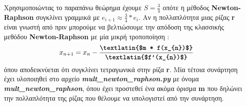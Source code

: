 \documentclass[First Project.tex]{subfiles}
\begin{document}
\begin{itemize}
            Χρησιμοποιώντας το παραπάνω θεώρημα έχουμε \(S = \frac {3}{4}\) οπότε η μέθοδος \textlatin{\textbf{Newton-Raphson}} συγκλίνει γραμμικά
            με \(e_{i+1} \approx \frac{3}{4} * e_{i}\). 
            Αν η πολλαπλότητα μιας ρίζας \textlatin{\textbf{r}} είναι γνωστή από πριν μπορούμε να βελτιώσουμε την απόδοση της κλασσικής μεθόδου \textlatin{\textbf{Newton-Raphson}}
            με μία μικρή τροποποίηση :
            \begin{equation*}
                x_{n+1} = x_{n} - \frac{\textbf{\textlatin{$m * f(x_{n})$}}} { \textbf{\textlatin{$f'(x_{n})$}} }
            \end{equation*}
            όπου αποδεικνύεται ότι συγκλίνει τετραγωνικά στην ρίζα \textlatin{\textbf{r}}. Μία τέτοια συνάρτηση έχει υλοποιηθεί στο αρχείο \textit{\textlatin{\textbf{mult\_newton\_raphson.py}}}
            με όνομα \textit{\textlatin{\textbf{mult\_newton\_raphson}}}, όπου έχει προστεθεί ένα ακόμα όρισμα \textlatin{\textbf{m}} που δηλώνει
            την πολλαπλότητα της ρίζας που θέλουμε να υπολογιστεί από την συνάρτηση.
    \end{itemize}
\end{document}
